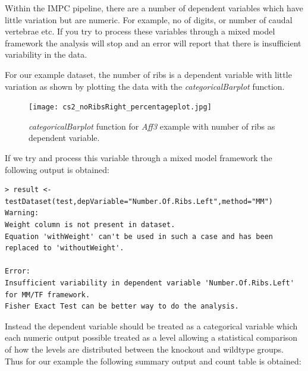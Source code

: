 \documentclass[12pt,a4paper]{article}
\begin{document}
Within the IMPC pipeline, there are a number of dependent variables which have little variation but are numeric. 
For example, no of digits, or number of caudal vertebrae etc.  
If you try to process these variables through a mixed model framework the analysis will stop and an error will report that there is insufficient variability in the data. 

For our example dataset, the number of ribs is a dependent variable with little variation as shown by plotting the data with the \textit{categoricalBarplot} function.

\begin{figure}[H]%
\centerline{\texttt{[image: cs2\_noRibsRight\_percentageplot.jpg]}}
\caption{\textit{categoricalBarplot} function for \textit{Aff3} example with number of ribs as dependent variable.}\label{fig:25}
\end{figure}


If we try and process this variable through a mixed model framework the following output is obtained: 


\begingroup
    \fontsize{8pt}{12pt}\selectfont
\begin{verbatim}
> result <- testDataset(test,depVariable="Number.Of.Ribs.Left",method="MM")
Warning:
Weight column is not present in dataset.
Equation 'withWeight' can't be used in such a case and has been replaced to 'withoutWeight'.

Error:
Insufficient variability in dependent variable 'Number.Of.Ribs.Left' for MM/TF framework. 
Fisher Exact Test can be better way to do the analysis.
\end{verbatim}
\endgroup 

Instead the dependent variable should be treated as a categorical variable which each numeric output possible treated as a level allowing 
a statistical comparison of how the levels are distributed between the knockout and wildtype groups.  
Thus for our example the following summary output and count table is obtained: 
\end{document}
